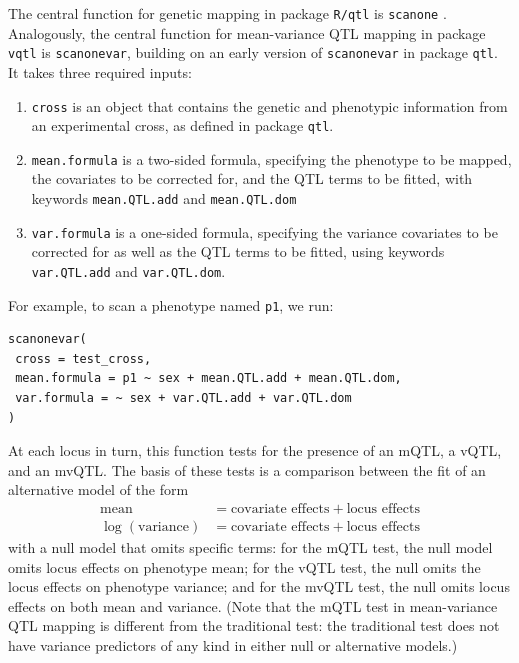 The central function for genetic mapping in package \texttt{R/qtl} is \texttt{scanone} \citep{Broman2003}.
Analogously, the central function for mean-variance QTL mapping in package \texttt{vqtl} is \texttt{scanonevar}, building on an early version of \texttt{scanonevar} in package \texttt{qtl}.
It takes three required inputs:
\begin{enumerate}
    \item \texttt{cross} is an object that contains the genetic and phenotypic information from an experimental cross, as defined in package \texttt{qtl}.
    \item \texttt{mean.formula} is a two-sided formula, specifying the phenotype to be mapped, the covariates to be corrected for, and the QTL terms to be fitted, with keywords \texttt{mean.QTL.add} and \texttt{mean.QTL.dom}
    \item \texttt{var.formula} is a one-sided formula, specifying the variance covariates to be corrected for as well as the QTL terms to be fitted, using keywords \texttt{var.QTL.add} and \texttt{var.QTL.dom}.
\end{enumerate}
For example, to scan a phenotype named \texttt{p1}, we run:
\begin{verbatim}
scanonevar(
 cross = test_cross,
 mean.formula = p1 ~ sex + mean.QTL.add + mean.QTL.dom,
 var.formula = ~ sex + var.QTL.add + var.QTL.dom
)
\end{verbatim}
At each locus in turn, this function tests for the presence of an mQTL, a vQTL, and an mvQTL. The basis of these tests is a comparison between the fit of an alternative model of the form
\begin{align*}
    \text{mean} &= \text{covariate effects} + \text{locus effects}\\
    \log(\text{variance}) &= \text{covariate effects} + \text{locus effects}    
\end{align*}
with a null model that omits specific terms: for the mQTL test, the null model omits locus effects on phenotype mean; for the vQTL test, the null omits the locus effects on phenotype variance; and for the mvQTL test, the null omits locus effects on both mean and variance.
(Note that the mQTL test in mean-variance QTL mapping is different from the traditional test: the traditional test does not have variance predictors of any kind in either null or alternative models.)


